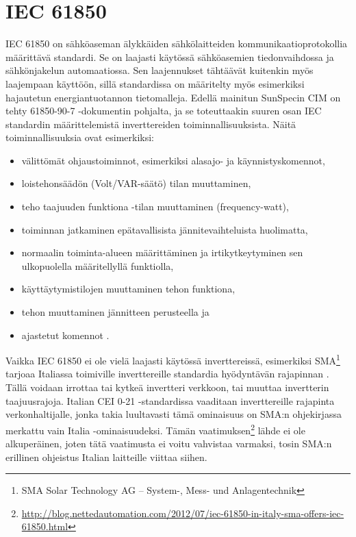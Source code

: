 \section{IEC 61850}
  \gls{IEC} 61850 on sähköaseman älykkäiden sähkölaitteiden kommunikaatioprotokollia määrittävä standardi. Se on laajasti käytössä sähköasemien tiedonvaihdossa ja sähkönjakelun automaatiossa. Sen laajennukset tähtäävät kuitenkin myös laajempaan käyttöön, sillä standardissa on määritelty myös esimerkiksi hajautetun energiantuotannon tietomalleja. Edellä mainitun SunSpecin CIM on tehty 61850-90-7 -dokumentin pohjalta, ja se toteuttaakin suuren osan IEC standardin määrittelemistä inverttereiden toiminnallisuuksista. Näitä toiminnallisuuksia ovat esimerkiksi:
  \begin{itemize}
    \item välittömät ohjaustoiminnot, esimerkiksi alasajo- ja käynnistyskomennot,
    \item loistehonsäädön (Volt/VAR-säätö) tilan muuttaminen,
    \item teho taajuuden funktiona -tilan muuttaminen (frequency-watt),
    \item toiminnan jatkaminen epätavallisista jännitevaihteluista huolimatta,
    \item normaalin toiminta-alueen määrittäminen ja irtikytkeytyminen sen ulkopuolella määritellyllä funktiolla,
    \item käyttäytymistilojen muuttaminen tehon funktiona,
    \item tehon muuttaminen jännitteen perusteella ja
    \item ajastetut komennot \parencite{61850funcs}.
  \end{itemize}

  Vaikka IEC 61850 ei ole vielä laajasti käytössä inverttereissä, esimerkiksi SMA\footnote{SMA Solar Technology AG -- System-, Mess- und Anlagentechnik} tarjoaa Italiassa toimiville inverttereille standardia hyödyntävän rajapinnan \parencite{SMAManual}. Tällä voidaan irrottaa tai kytkeä invertteri verkkoon, tai muuttaa invertterin taajuusrajoja. Italian CEI 0-21 -standardissa vaaditaan inverttereille rajapinta verkonhaltijalle, jonka takia luultavasti tämä ominaisuus on SMA:n ohjekirjassa merkattu vain Italia -ominaisuudeksi. Tämän vaatimuksen\footnote{\url{http://blog.nettedautomation.com/2012/07/iec-61850-in-italy-sma-offers-iec-61850.html}} lähde ei ole alkuperäinen, joten tätä vaatimusta ei voitu vahvistaa varmaksi, tosin SMA:n erillinen ohjeistus Italian laitteille viittaa siihen.

